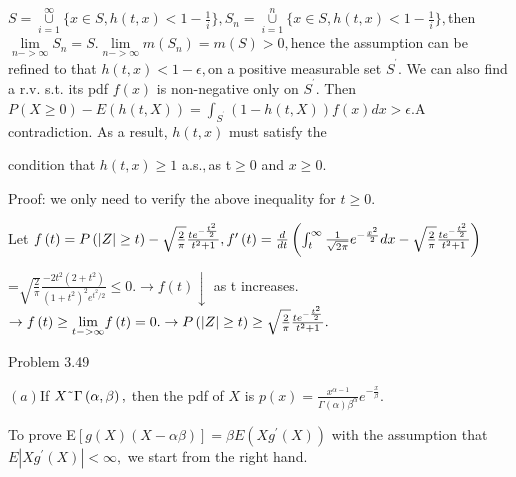 \documentclass{article}
\begin{document}
$S=\underset{i=1}{\overset{\infty }{\cup }}\{x\in S,h\left( t,x\right) <1-%
\frac{1}{i}\},S_{n}=\underset{i=1}{\overset{n}{\cup }}\{x\in S,h\left(
t,x\right) <1-\frac{1}{i}\},$then $\underset{n->\infty }{\lim }S_{n}=S.%
\underset{n->\infty }{\lim }m\left( S_{n}\right) =m\left( S\right) >0,$hence
the assumption can be refined to that $h\left( t,x\right) <1-\epsilon ,$on a
positive measurable set $S^{^{\prime }}.$ We can also find a r.v. s.t. its
pdf $f\left( x\right) $ is non-negative only on $S^{^{\prime }}$. Then $%
P\left( X\geq 0\right) -E\left( h\left( t,X\right) \right)
=\int_{S^{^{\prime }}}\left( 1-h\left( t,X\right) \right) f\left( x\right)
dx>\epsilon .$A contradiction. As a result, $h\left( t,x\right) $ must
satisfy the 

condition that $h\left( t,x\right) \geq 1$ a.s.$,$as t$\geq 0$ and $x\geq 0.$


\bigskip Proof: we only need to verify the above inequality for $t\geq 0.$

Let $f\left( t\right) =P\left( \left\vert Z\right\vert \geq t\right) -\sqrt{%
\frac{2}{\pi }}\frac{te^{-\frac{t^{2}}{2}}}{t^{2}+1},f^{\prime }\left(
t\right) =\frac{d}{dt}\left( \int_{t}^{\infty }\frac{1}{\sqrt{2\pi }}e^{-%
\frac{x^{2}}{2}}dx-\sqrt{\frac{2}{\pi }}\frac{te^{-\frac{t^{2}}{2}}}{t^{2}+1}%
\right) $

=$\sqrt{\frac{2}{\pi }}\frac{-2t^{2}\left( 2+t^{2}\right) }{\left(
1+t^{2}\right) ^{2}e^{t^{2}/2}}\leq 0.\rightarrow f\left( t\right)
\downarrow $ as t increases. $\rightarrow f\left( t\right) \geq \underset{%
t->\infty }{\lim }f\left( t\right) =0.\rightarrow P\left( \left\vert
Z\right\vert \geq t\right) \geq \sqrt{\frac{2}{\pi }}\frac{te^{-\frac{t^{2}}{%
2}}}{t^{2}+1}.$  

Problem 3.49

$\left( a\right) $If $X\symbol{126}\Gamma \left( \alpha ,\beta \right) ,$%
then the pdf of $X$ is $p(x)=\frac{x^{\alpha -1}}{\Gamma \left( \alpha
\right) \beta ^{\alpha }}e^{-\frac{x}{\beta }}.$

To prove E$\left[ g\left( X\right) \left( X-\alpha \beta \right) \right]
=\beta E\left( Xg^{\prime }\left( X\right) \right) $ with the assumption
that $E\left\vert Xg^{\prime }\left( X\right) \right\vert <\infty ,$ we
start from the right hand.
\end{document}
